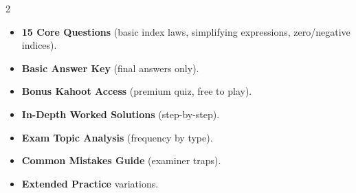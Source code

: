 \documentclass[11pt,a4paper]{article}
\newcommand{\FullReleaseDate}{April 30, 2026}
\begin{document}
\vspace{8pt}

\begin{multicols}{2}
  \begin{tcolorbox}[card, title=\sffamily\bfseries\textcolor{white}{\faHandPointDown\ TODAY (Simplified Version)}, colbacktitle=mainblue, boxed title style={sharp corners, boxrule=0pt}]
    \begin{itemize}[leftmargin=1.2em, itemsep=2pt]
      \item \small \textbf{15 Core Questions} (basic index laws, simplifying expressions, zero/negative indices).
      \item \small \textbf{Basic Answer Key} (final answers only).
      \item \small \textbf{Bonus Kahoot Access} (premium quiz, free to play).
    \end{itemize}
  \end{tcolorbox}

  \columnbreak

  \begin{tcolorbox}[card, title=\sffamily\bfseries\textcolor{white}{\faRocket\ ON \FullReleaseDate\ (Full Upgrade)}, colbacktitle=mainblue, boxed title style={sharp corners, boxrule=0pt}]
    \begin{itemize}[leftmargin=1.2em, itemsep=2pt]
      \item \small \textbf{In-Depth Worked Solutions} (step-by-step).
      \item \small \textbf{Exam Topic Analysis} (frequency by type).
      \item \small \textbf{Common Mistakes Guide} (examiner traps).
      \item \small \textbf{Extended Practice} variations.
    \end{itemize}
  \end{tcolorbox}
\end{multicols}
\end{document}
